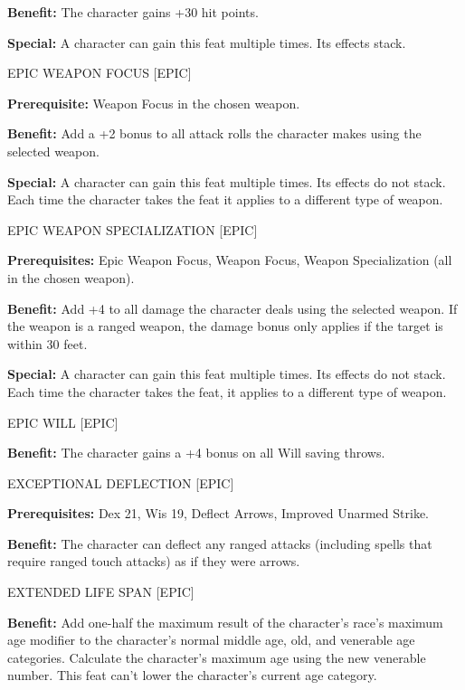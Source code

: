 \documentclass{article}
\begin{document}
\textbf{Benefit:} The character gains +30 hit points. 

\textbf{Special:} A character can gain this feat multiple times. Its effects stack. 

\vspace{12pt}
EPIC WEAPON FOCUS [EPIC] 

\textbf{Prerequisite:} Weapon Focus in the chosen weapon. 

\textbf{Benefit:} Add a +2 bonus to all attack rolls the character makes using 
the selected weapon. 

\textbf{Special:} A character can gain this feat multiple times. Its effects do 
not stack. Each time the character takes the feat it applies to a different type 
of weapon. 

\vspace{12pt}
EPIC WEAPON SPECIALIZATION [EPIC] 

\textbf{Prerequisites:} Epic Weapon Focus, Weapon Focus, Weapon Specialization 
(all in the chosen weapon). 

\textbf{Benefit:} Add +4 to all damage the character deals using the selected weapon. 
If the weapon is a ranged weapon, the damage bonus only applies if the target is 
within 30 feet. 

\textbf{Special:} A character can gain this feat multiple times. Its effects do 
not stack. Each time the character takes the feat, it applies to a different type 
of weapon. 

\vspace{12pt}
EPIC WILL [EPIC] 

\textbf{Benefit:} The character gains a +4 bonus on all Will saving throws. 

\vspace{12pt}
EXCEPTIONAL DEFLECTION [EPIC] 

\textbf{Prerequisites:} Dex 21, Wis 19, Deflect Arrows, Improved Unarmed Strike. 

\textbf{Benefit:} The character can deflect any ranged attacks (including spells 
that require ranged touch attacks) as if they were arrows. 

\vspace{12pt}
EXTENDED LIFE SPAN [EPIC] 

\textbf{Benefit:} Add one-half the maximum result of the character's race's maximum 
age modifier to the character's normal middle age, old, and venerable age categories. 
Calculate the character's maximum age using the new venerable number. This feat 
can't lower the character's current age category. 
\end{document}
